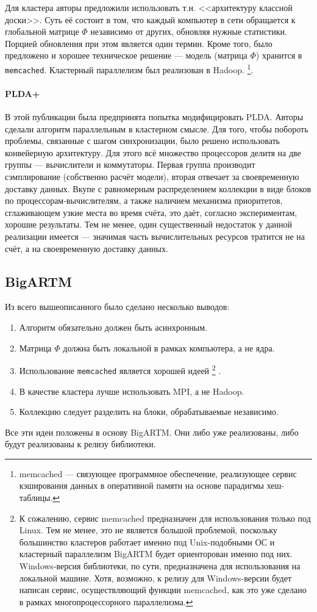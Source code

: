 Для кластера авторы предложили использовать т.н. <<архитектуру классной доски>>. Суть её состоит в том, что каждый компьютер в сети обращается к глобальной матрице $\Phi$ независимо от других, обновляя нужные статистики. Порцией обновления при этом является один термин. Кроме того, было предложено и хорошее техническое решение --- модель (матрица $\Phi$) хранится в \verb|memcached|. Кластерный параллелизм был реализован в Hadoop.
\footnote{memcached — связующее программное обеспечение, реализующее сервис кэширования данных в оперативной памяти на основе парадигмы хеш-таблицы.}.

\paragraph{PLDA+}
В этой публикации была предпринята попытка модифицировать PLDA. Авторы сделали алгоритм параллельным в кластерном смысле. Для того, чтобы побороть проблемы, связанные с шагом синхронизации, было решено использовать конвейерную архитектуру. Для этого всё множество процессоров делитя на две группы --- вычислители и коммутаторы. Первая группа производит сэмплирование (собственно расчёт модели), вторая отвечает за своевременную доставку данных. Вкупе с равномерным распределением коллекции в виде блоков по процессорам-вычислителям, а также наличием механизма приоритетов, сглаживающем узкие места во время счёта, это даёт, согласно экспериментам, хорошие результаты. Тем не менее, один существенный недостаток у данной реализации имеется --- значимая часть вычислительных ресурсов тратится не на счёт, а на своевременную доставку данных.

\subsection{BigARTM}
Из всего вышеописанного было сделано несколько выводов:

\begin{enumerate}
	\item Алгоритм обязательно должен быть асинхронным.
	\item Матрица $\Phi$ должна быть локальной в рамках компьютера, а не ядра.
	\item Использование \verb|memcached| является хорошей идеей
	\footnote{К сожалению, сервис memcached предназначен для использования только под Linux. Тем не менее, это не является большой проблемой, поскольку большинство кластеров работает именно под Unix-подобными ОС и кластерный параллелизм BigARTM будет ориенторован именно под них. Windows-версия библиотеки, по сути, предназначена для использования на локальной машине. Хотя, возможно, к релизу для Windows-версии будет написан сервис, осуществляющий функции memcached, как это уже сделано в рамках многопроцессорного параллелизма.}
	.
	\item В качестве кластера лучше использовать MPI, а не Hadoop.
	\item Коллекцию следует разделить на блоки, обрабатываемые независимо.
\end{enumerate}

Все эти идеи положены в основу BigARTM. Они либо уже реализованы, либо будут реализованы к релизу библиотеки.